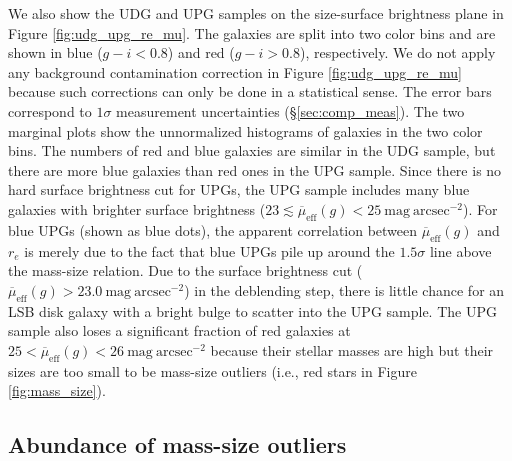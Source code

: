\documentclass[twocolumn,astrosymb,twocolappendix,linenumbers]{aastex631}
\newcommand{\sbunit}{\mathrm{mag\ arcsec}^{-2}}
\newcommand{\sbeff}{\overline{\mu}_{\mathrm{eff}}(g)}
\begin{document}
\begin{CJK*}{UTF8}{gbsn}
We also show the UDG and UPG samples on the size-surface brightness plane in Figure \ref{fig:udg_upg_re_mu}. The galaxies are split into two color bins and are shown in blue ($g-i < 0.8$) and red ($g-i > 0.8$), respectively. We do not apply any background contamination correction in Figure \ref{fig:udg_upg_re_mu} because such corrections can only be done in a statistical sense. The error bars correspond to $1\sigma$ measurement uncertainties (\S\ref{sec:comp_meas}). The two marginal plots show the unnormalized histograms of galaxies in the two color bins. The numbers of red and blue galaxies are similar in the UDG sample, but there are more blue galaxies than red ones in the UPG sample. Since there is no hard surface brightness cut for UPGs, the UPG sample includes many blue galaxies with brighter surface brightness ($23 \lesssim \sbeff < 25\ \sbunit$). For blue UPGs (shown as blue dots), the apparent correlation between $\sbeff$ and $r_e$ is merely due to the fact that blue UPGs pile up around the $1.5\sigma$ line above the mass-size relation. Due to the surface brightness cut ($\sbeff > 23.0\ \sbunit$) in the deblending step, there is little chance for an LSB disk galaxy with a bright bulge to scatter into the UPG sample. The UPG sample also loses a significant fraction of red galaxies at $25 < \sbeff < 26\ \sbunit$ because their stellar masses are high but their sizes are too small to be mass-size outliers (i.e., red stars in Figure \ref{fig:mass_size}). 


\subsection{Abundance of mass-size outliers}\label{sec:n_udg}


\end{CJK*}
\end{document}
